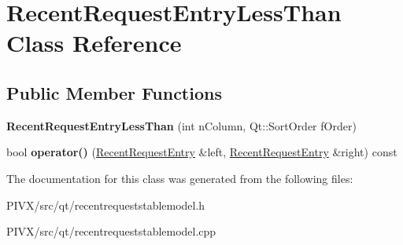 \hypertarget{class_recent_request_entry_less_than}{}\section{Recent\+Request\+Entry\+Less\+Than Class Reference}
\label{class_recent_request_entry_less_than}
\subsection*{Public Member Functions}
\begin{DoxyCompactItemize}
\item 
\mbox{\label{class_recent_request_entry_less_than_a978c435f706bc5526a322ecb88f63e41}} 
{\bfseries Recent\+Request\+Entry\+Less\+Than} (int n\+Column, Qt\+::\+Sort\+Order f\+Order)
\item 
\mbox{\label{class_recent_request_entry_less_than_ae81233db157bd5d494dc5b98de6be7dd}} 
bool {\bfseries operator()} (\mbox{\hyperlink{class_recent_request_entry}{Recent\+Request\+Entry}} \&left, \mbox{\hyperlink{class_recent_request_entry}{Recent\+Request\+Entry}} \&right) const
\end{DoxyCompactItemize}


The documentation for this class was generated from the following files\+:\begin{DoxyCompactItemize}
\item 
P\+I\+V\+X/src/qt/recentrequeststablemodel.\+h\item 
P\+I\+V\+X/src/qt/recentrequeststablemodel.\+cpp\end{DoxyCompactItemize}
